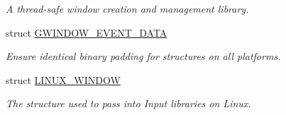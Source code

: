 \begin{DoxyCompactItemize}
\begin{DoxyCompactList}\small\item\em A thread-\/safe window creation and management library. \end{DoxyCompactList}\item 
struct \mbox{\hyperlink{structGW_1_1SYSTEM_1_1GWINDOW__EVENT__DATA}{G\+W\+I\+N\+D\+O\+W\+\_\+\+E\+V\+E\+N\+T\+\_\+\+D\+A\+TA}}
\begin{DoxyCompactList}\small\item\em Ensure identical binary padding for structures on all platforms. \end{DoxyCompactList}\item 
struct \mbox{\hyperlink{structGW_1_1SYSTEM_1_1LINUX__WINDOW}{L\+I\+N\+U\+X\+\_\+\+W\+I\+N\+D\+OW}}
\begin{DoxyCompactList}\small\item\em The structure used to pass into Input libraries on Linux. \end{DoxyCompactList}\end{DoxyCompactItemize}
